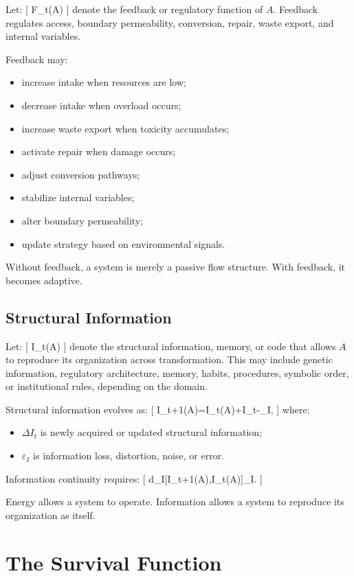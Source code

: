 \documentclass[11pt,a4paper]{article}
\begin{document}
Let:
[
F_t(A)
]
denote the feedback or regulatory function of $A$. Feedback regulates access, boundary permeability, conversion, repair, waste export, and internal variables.

Feedback may:
\begin{itemize}[leftmargin=2em]
\item increase intake when resources are low;
\item decrease intake when overload occurs;
\item increase waste export when toxicity accumulates;
\item activate repair when damage occurs;
\item adjust conversion pathways;
\item stabilize internal variables;
\item alter boundary permeability;
\item update strategy based on environmental signals.
\end{itemize}

Without feedback, a system is merely a passive flow structure. With feedback, it becomes adaptive.

\subsection{Structural Information}

Let:
[
I_t(A)
]
denote the structural information, memory, or code that allows $A$ to reproduce its organization across transformation. This may include genetic information, regulatory architecture, memory, habits, procedures, symbolic order, or institutional rules, depending on the domain.

Structural information evolves as:
[
I_{t+1}(A)=I_t(A)+\Delta I_t-\varepsilon_I,
]
where:
\begin{itemize}[leftmargin=2em]
\item $\Delta I_t$ is newly acquired or updated structural information;
\item $\varepsilon_I$ is information loss, distortion, noise, or error.
\end{itemize}

Information continuity requires:
[
d_I[I_{t+1}(A),I_t(A)]\leq \theta_I.
]

Energy allows a system to operate. Information allows a system to reproduce its organization as itself.

\section{The Survival Function}
\end{document}

